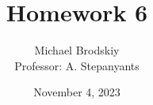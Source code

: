 


\title{Homework 6}
\date{November 4, 2023}
\author{Michael Brodskiy\\ \small Professor: A. Stepanyants}



\maketitle

